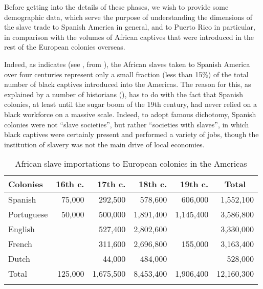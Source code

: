 \documentclass[output=paper,colorlinks,citecolor=brown]{langscibook}
\begin{document}
Before getting into the details of these phases, we wish to provide some demographic data, which serve the purpose of understanding the dimensions of the slave trade to Spanish America in general, and to Puerto Rico in particular, in comparison with the volumes of African captives that were introduced in the rest of the European colonies overseas. 

Indeed, as \citet[115]{Lucena2000} indicates (see , from \citealt[88]{Curtin1969}), the African slaves taken to Spanish America over four centuries represent only a small fraction (less than 15\%) of the total number of black captives introduced into the Americas. The reason for this, as explained by a number of historians (\citealt{Andrés-Gallego2005,Cushner1980,Brockington2006}), has to do with the fact that Spanish colonies, at least until the sugar boom of the 19th century, had never relied on a black workforce on a massive scale. Indeed, to adopt  famous dichotomy, Spanish colonies were not “slave societies”, but rather “societies with slaves”, in which black captives were certainly present and performed a variety of jobs, though the institution of slavery was not the main drive of local economies.

\begin{table}
\begin{tabular}{lrrrrr}
\lsptoprule
 {Colonies} & {16th c.} & {17th c.} & {18th c.} & {19th c.} & \multicolumn{1}{c}{Total}\\
 \midrule
 {Spanish} & 75,000 & 292,500 & 578,600 & 606,000 & 1,552,100\\
 {Portuguese} & 50,000 & 500,000 & 1,891,400 & 1,145,400 & 3,586,800\\
 {English} &  & 527,400 & 2,802,600 &  & 3,330,000\\
 {French} &  & 311,600 & 2,696,800 & 155,000 & 3,163,400\\
 {Dutch} &  & 44,000 & 484,000 &  & 528,000\\
 \midrule
 {Total} & 125,000 & 1,675,500 & 8,453,400 & 1,906,400 & 12,160,300\\
\lspbottomrule
\end{tabular}
\caption{African slave importations to European colonies in the Americas\label{tab:visconti:1}}
\end{table}
\end{document}

